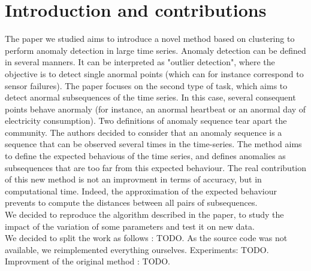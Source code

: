 \documentclass[11pt]{article}
\begin{document}

\section{Introduction and contributions}
The paper we studied aims to introduce a novel method based on clustering to perform anomaly detection in large time series. 
Anomaly detection can be defined in several manners. 
It can be interpreted as "outlier detection", where the objective is to detect single anormal points (which can for instance correspond to sensor failures). 
The paper focuses on the second type of task, which aims to detect anormal subsequences of the time series. 
In this case, several consequent points behave anormaly (for instance, an anormal heartbeat or an anormal day of electricity consumption).
Two definitions of anomaly sequence tear apart the community.
The authors decided to consider that an anomaly sequence is a sequence that can be observed several times in the time-series. 
The method aims to define the expected behavious of the time series, and defines anomalies as subsequences that are too far from this expected behaviour.
The real contribution of this new method is not an improvment in terms of accuracy, but in computational time. 
Indeed, the approximation of the expected behaviour prevents to compute the distances between all pairs of subsequences. \\
We decided to reproduce the algorithm described in the paper, to study the impact of the variation of some parameters and test it on new data. \\
We decided to split the work as follows : TODO. As the source code was not available, we reimplemented everything ourselves. 
Experiments: TODO.
Improvment of the original method : TODO.
\end{document}
